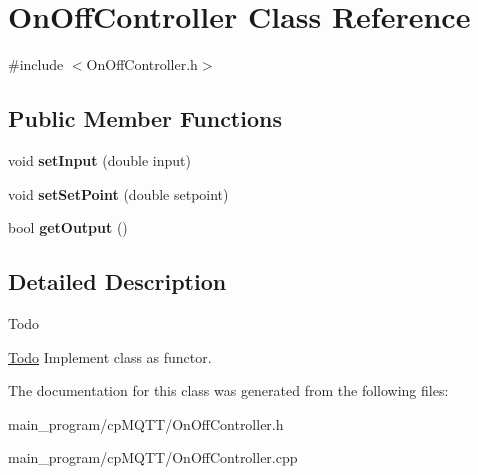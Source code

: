 \hypertarget{class_on_off_controller}{}\section{On\+Off\+Controller Class Reference}
\label{class_on_off_controller}


{\ttfamily \#include $<$On\+Off\+Controller.\+h$>$}

\subsection*{Public Member Functions}
\begin{DoxyCompactItemize}
\item 
void {\bfseries set\+Input} (double input)\hypertarget{class_on_off_controller_a94b1e6899b79203583f851f87f600d38}{}\label{class_on_off_controller_a94b1e6899b79203583f851f87f600d38}

\item 
void {\bfseries set\+Set\+Point} (double setpoint)\hypertarget{class_on_off_controller_a8b418561b1d18a6f965ec14ebc687b3a}{}\label{class_on_off_controller_a8b418561b1d18a6f965ec14ebc687b3a}

\item 
bool {\bfseries get\+Output} ()\hypertarget{class_on_off_controller_a071612fb91806febcdda330bd8348add}{}\label{class_on_off_controller_a071612fb91806febcdda330bd8348add}

\end{DoxyCompactItemize}


\subsection{Detailed Description}
\begin{DoxyRefDesc}{Todo}
\item[\hyperlink{todo__todo000001}{Todo}]Implement class as functor. \end{DoxyRefDesc}


The documentation for this class was generated from the following files\+:\begin{DoxyCompactItemize}
\item 
main\+\_\+program/cp\+M\+Q\+T\+T/On\+Off\+Controller.\+h\item 
main\+\_\+program/cp\+M\+Q\+T\+T/On\+Off\+Controller.\+cpp\end{DoxyCompactItemize}
